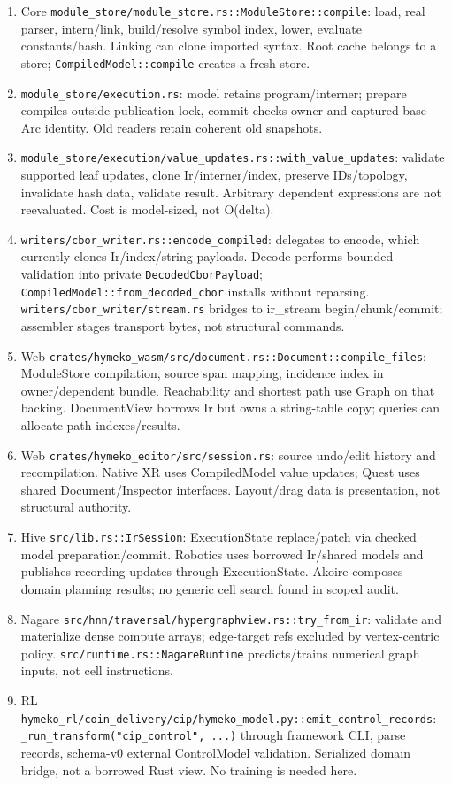 \documentclass[10pt,a4paper]{article}
\newcommand{\code}[1]{{\small\nolinkurl{#1}}}
\begin{document}
\begin{enumerate}
\item Core \code{module_store/module_store.rs::ModuleStore::compile}: load, real parser, intern/link, build/resolve symbol index, lower, evaluate constants/hash. Linking can clone imported syntax. Root cache belongs to a store; \code{CompiledModel::compile} creates a fresh store.
\item \code{module_store/execution.rs}: model retains program/interner; prepare compiles outside publication lock, commit checks owner and captured base Arc identity. Old readers retain coherent old snapshots.
\item \code{module_store/execution/value_updates.rs::with_value_updates}: validate supported leaf updates, clone Ir/interner/index, preserve IDs/topology, invalidate hash data, validate result. Arbitrary dependent expressions are not reevaluated. Cost is model-sized, not O(delta).
\item \code{writers/cbor_writer.rs::encode_compiled}: delegates to encode, which currently clones Ir/index/string payloads. Decode performs bounded validation into private \code{DecodedCborPayload}; \code{CompiledModel::from_decoded_cbor} installs without reparsing. \code{writers/cbor_writer/stream.rs} bridges to ir\_stream begin/chunk/commit; assembler stages transport bytes, not structural commands.
\item Web \code{crates/hymeko_wasm/src/document.rs::Document::compile_files}: ModuleStore compilation, source span mapping, incidence index in owner/dependent bundle. Reachability and shortest path use Graph on that backing. DocumentView borrows Ir but owns a string-table copy; queries can allocate path indexes/results.
\item Web \code{crates/hymeko_editor/src/session.rs}: source undo/edit history and recompilation. Native XR uses CompiledModel value updates; Quest uses shared Document/Inspector interfaces. Layout/drag data is presentation, not structural authority.
\item Hive \code{src/lib.rs::IrSession}: ExecutionState replace/patch via checked model preparation/commit. Robotics uses borrowed Ir/shared models and publishes recording updates through ExecutionState. Akoire composes domain planning results; no generic cell search found in scoped audit.
\item Nagare \code{src/hnn/traversal/hypergraphview.rs::try_from_ir}: validate and materialize dense compute arrays; edge-target refs excluded by vertex-centric policy. \code{src/runtime.rs::NagareRuntime} predicts/trains numerical graph inputs, not cell instructions.
\item RL \code{hymeko_rl/coin_delivery/cip/hymeko_model.py::emit_control_records}: \code{_run_transform("cip_control", ...)} through framework CLI, parse records, schema-v0 external ControlModel validation. Serialized domain bridge, not a borrowed Rust view. No training is needed here.
\end{enumerate}
\end{document}
